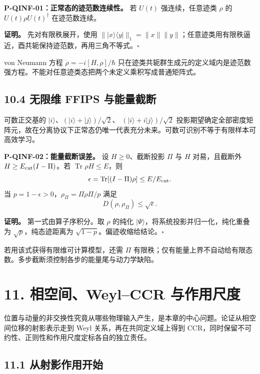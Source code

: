 \documentclass[
  11pt,
  oneside]{book}
\begin{document}
\protect\hypertarget{p-qinf-01}{}{}

\textbf{P-QINF-01：正常态的迹范数连续性。} 若 \(U(t)\) 强连续，任意迹类
\(\rho\) 的 \(U(t)\rho U(t)^\dagger\) 在迹范数连续。

\textbf{证明。} 先对有限秩展开，使用
\(\||x\rangle\langle y|\|_1=\|x\|\|y\|\)；任意迹类用有限秩逼近，酉共轭保持迹范数，再用三角不等式。\(\square\)

von Neumann 方程 \(\dot\rho=-i[H,\rho]/\hbar\)
只在迹类共轭群生成元的定义域内是迹范数强方程。不能对任意迹类态把两个未定义乘积写成普通矩阵式。

\section{10.4 无限维 FFIPS 与能量截断}

可数正交基的 \(|i\rangle\)、\((|i\rangle+|j\rangle)/\sqrt2\)、
\((|i\rangle+i|j\rangle)/\sqrt2\)
投影期望确定全部密度矩阵元，故在分离协议下正常态仍唯一代表充分未来。可数可识别不等于有限样本可高效学习。

\protect\hypertarget{p-qinf-02}{}{}

\textbf{P-QINF-02：能量截断误差。} 设 \(H\ge0\)、截断投影 \(\Pi\) 与
\(H\) 对易，且截断外 \(H\ge E_{\rm cut}(I-\Pi)\)。若
\(\operatorname{Tr}\rho H\le E\)，则 \[
\epsilon=\operatorname{Tr}[(I-\Pi)\rho]\le E/E_{\rm cut}.
\] 当 \(p=1-\epsilon>0\)，\(\rho_\Pi=\Pi\rho\Pi/p\) 满足 \[
D(\rho,\rho_\Pi)\le\sqrt{\epsilon}.
\]

\textbf{证明。} 第一式由算子序积分。取 \(\rho\) 的纯化
\(|\Psi\rangle\)，将系统投影并归一化，纯化重叠为
\(\sqrt p\)，纯态迹距离为 \(\sqrt{1-p}\)。偏迹收缩给结论。\(\square\)

若用该式获得有限维可计算模型，还需 \(\Pi\)
有限秩；仅有能量上界不自动给有限态数。多步截断须控制各步的能量尾与动力学缺陷。

\chapter{11. 相空间、Weyl--CCR 与作用尺度}\label{ch-11}\hypertarget{ch-11}{}

位置与动量的非交换性究竟从哪些物理输入产生，是本章的中心问题。论证从相空间位移的射影表示走到
Weyl 关系，再在共同定义域上得到
CCR，同时保留不可约性、正则性和作用尺度定标各自的独立责任。

\section{11.1 从射影作用开始}
\end{document}
